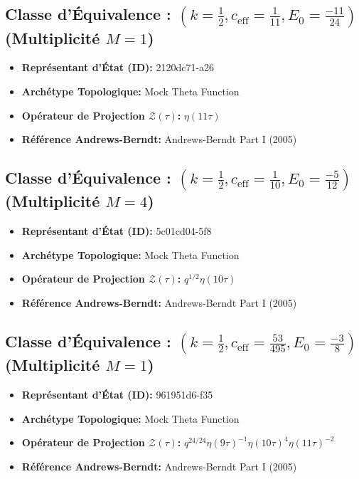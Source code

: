 \documentclass[11pt,twoside,openright]{book}
\begin{document}
\subsection*{Classe d'Équivalence : $(k=\frac{1}{2}, c_{\text{eff}}=\frac{1}{11}, E_0=\frac{-11}{24})$ (Multiplicité $M=1$)}
\begin{itemize}
  \item \textbf{Représentant d'État (ID):} 2120dc71-a26
  \item \textbf{Archétype Topologique:} Mock Theta Function
  \item \textbf{Opérateur de Projection $\mathcal{Z}(\tau)$:} $\eta(11\tau)$
  \item \textbf{Référence Andrews-Berndt:} Andrews-Berndt Part I (2005)
\end{itemize}

\subsection*{Classe d'Équivalence : $(k=\frac{1}{2}, c_{\text{eff}}=\frac{1}{10}, E_0=\frac{-5}{12})$ (Multiplicité $M=4$)}
\begin{itemize}
  \item \textbf{Représentant d'État (ID):} 5c01cd04-5f8
  \item \textbf{Archétype Topologique:} Mock Theta Function
  \item \textbf{Opérateur de Projection $\mathcal{Z}(\tau)$:} $q^{1/2} \eta(10\tau)$
  \item \textbf{Référence Andrews-Berndt:} Andrews-Berndt Part I (2005)
\end{itemize}

\subsection*{Classe d'Équivalence : $(k=\frac{1}{2}, c_{\text{eff}}=\frac{53}{495}, E_0=\frac{-3}{8})$ (Multiplicité $M=1$)}
\begin{itemize}
  \item \textbf{Représentant d'État (ID):} 961951d6-f35
  \item \textbf{Archétype Topologique:} Mock Theta Function
  \item \textbf{Opérateur de Projection $\mathcal{Z}(\tau)$:} $q^{24/24} \eta(9\tau)^{-1} \eta(10\tau)^{4} \eta(11\tau)^{-2}$
  \item \textbf{Référence Andrews-Berndt:} Andrews-Berndt Part I (2005)
\end{itemize}
\end{document}
